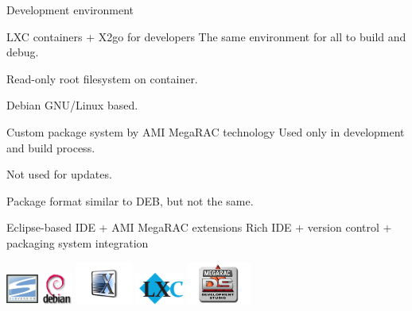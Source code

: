 \documentclass{beamer}
\begin{document}
  \begin{frame}{Development environment}
	  \begin{block}{LXC containers + X2go for developers}
		  The same environment for all to build and debug.

		  Read-only root filesystem on container.

		  Debian GNU/Linux based.
	  \end{block}
	  
	  \begin{block}{Custom package system by AMI MegaRAC technology}
		  Used only in development and build process.

		  Not used for updates.

		  Package format similar to DEB, but not the same.
	  \end{block}

	  \begin{block}{Eclipse-based IDE + AMI MegaRAC extensions}
		  Rich IDE + version control + packaging system integration
	  \end{block}
	  
	  \includegraphics[height=30pt,width=30pt]{logo/subversion.png}
	  \includegraphics[height=30pt]{logo/debian.png}
	  \includegraphics[height=40pt]{logo/x2go-logo.png}
	  \includegraphics[height=30pt]{logo/lxc.png}
	  \includegraphics[height=40pt]{logo/megarac-development-studio.png}

  \end{frame}
\end{document}
